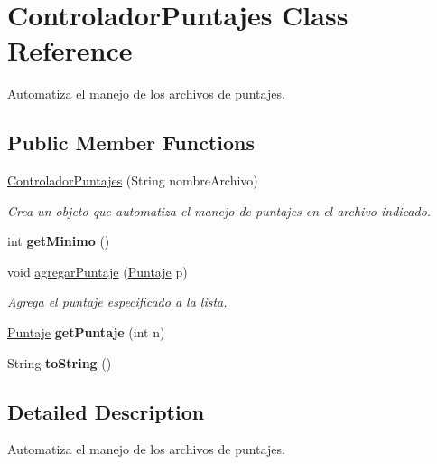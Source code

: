\hypertarget{class_controlador_puntajes}{}\section{Controlador\+Puntajes Class Reference}
\label{class_controlador_puntajes}


Automatiza el manejo de los archivos de puntajes.  


\subsection*{Public Member Functions}
\begin{DoxyCompactItemize}
\item 
\mbox{\hyperlink{class_controlador_puntajes_ab192cfbffc96954094f47b5b66e8cda5}{Controlador\+Puntajes}} (String nombre\+Archivo)
\begin{DoxyCompactList}\small\item\em Crea un objeto que automatiza el manejo de puntajes en el archivo indicado. \end{DoxyCompactList}\item 
\mbox{\label{class_controlador_puntajes_ad44446c5c7a56f497edf2982d0fcc952}} 
int {\bfseries get\+Minimo} ()
\item 
void \mbox{\hyperlink{class_controlador_puntajes_a101a964a47c4ed0036f70c3a5c2d58ca}{agregar\+Puntaje}} (\mbox{\hyperlink{class_puntaje}{Puntaje}} p)
\begin{DoxyCompactList}\small\item\em Agrega el puntaje especificado a la lista. \end{DoxyCompactList}\item 
\mbox{\label{class_controlador_puntajes_a973c3ca7103da4783b64b46cc716532e}} 
\mbox{\hyperlink{class_puntaje}{Puntaje}} {\bfseries get\+Puntaje} (int n)
\item 
\mbox{\label{class_controlador_puntajes_a51d112050ac7772fe74bc1290a14f2f3}} 
String {\bfseries to\+String} ()
\end{DoxyCompactItemize}


\subsection{Detailed Description}
Automatiza el manejo de los archivos de puntajes. 

